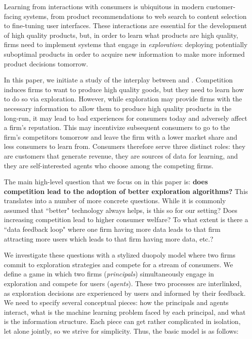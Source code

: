 Learning from interactions with consumers is ubiquitous in modern customer-facing systems, from product recommendations to web search to content selection to fine-tuning user interfaces. These interactions are essential for the development of high quality products, but, in order to learn what products are high quality, firms need to implement systems that engage in \emph{exploration}: deploying potentially suboptimal products in order to acquire new information to make more informed product decisions tomorrow.

In this paper, we initiate a study of the interplay between \exploration and \competition. Competition induces firms to want to produce high quality goods, but they need to learn how to do so via exploration. However, while exploration may provide firms with the necessary information to allow them to produce high quality products in the long-run, it may lead to bad experiences for consumers today and adversely affect a firm's reputation. This may incentivize subsequent consumers to go to the firm's competitors tomorrow and leave the firm with a lower market share and less consumers to learn from. Consumers therefore serve three distinct roles: they are customers that generate revenue, they are sources of data for learning, and they are self-interested agents who choose among the competing firms.

The main high-level question that we focus on in this paper is: {\bf does competition lead to the adoption of better exploration algorithms?} This translates into a number of more concrete questions. While it is commonly assumed that ``better" technology always helps, is this so for our setting? Does increasing competition lead to higher consumer welfare? To what extent is there a ``data feedback loop" where one firm having more data leads to that firm attracting more users which leads to that firm having more data, etc.?




 We investigate these questions with a stylized duopoly model where two firms commit to exploration strategies and compete for a stream of consumers. We define a game in which two firms (\emph{principals}) simultaneously engage in exploration and compete for users (\emph{agents}). These two processes are interlinked, as exploration decisions are experienced by users and informed by their feedback. We need to specify several conceptual pieces: how the principals and agents interact, what is the machine learning problem faced by each principal, and what is the information structure. Each piece can get rather complicated in isolation, let alone jointly, so we strive for simplicity. Thus, the basic model is as follows:

